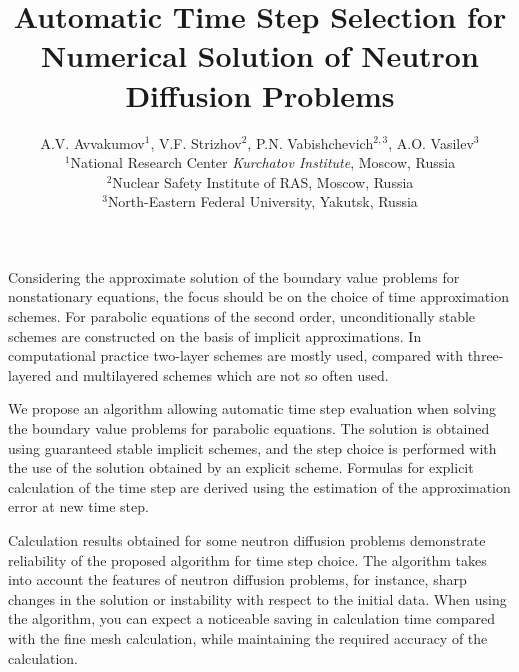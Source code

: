 \documentclass[12pt,a4paper]{article}
\title{\bf Automatic Time Step Selection for Numerical Solution of Neutron Diffusion Problems}
\author
{A.V. Avvakumov$^{1}$, V.F. Strizhov$^{2}$, P.N. Vabishchevich$^{2,3}$, A.O. Vasilev$^{3}$ 
\\ 
$^1$National Research Center \emph{Kurchatov Institute}, Moscow, Russia \\
$^2$Nuclear Safety Institute of RAS,  Moscow, Russia \\
$^3$North-Eastern Federal University, Yakutsk, Russia
}
\date{}
\begin{document}
\maketitle 
Considering the approximate solution of the boundary value problems for nonstationary equations, the focus should be on the choice of time approximation schemes.
For parabolic equations of the second order, unconditionally stable schemes are constructed on the basis of implicit approximations.
In computational practice two-layer schemes are mostly used, compared with three-layered and multilayered schemes which are not so often used.

We propose an algorithm allowing automatic time step evaluation when solving the boundary value problems	for parabolic equations.
The solution is obtained using guaranteed stable implicit schemes, and the step choice is performed with the use of the solution obtained by an explicit scheme.
Formulas for explicit calculation of the time step are derived using the estimation of the approximation error at new time step.

Calculation results obtained for some neutron diffusion problems demonstrate reliability of the proposed algorithm for time step choice. The algorithm takes into account the features of neutron diffusion problems, for instance, sharp changes in the solution or instability with respect to the initial data. When using the algorithm, you can expect a noticeable saving in calculation time compared with the fine mesh calculation, while maintaining the required accuracy of the calculation.
\end{document}
